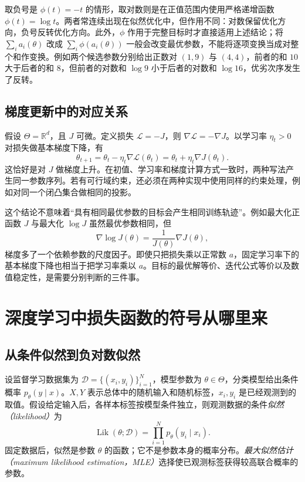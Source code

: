 \documentclass[UTF8,12pt,a4paper,fontset=fandol]{ctexart}
\begin{document}
取负号是 $\phi(t)=-t$ 的情形，取对数则是在正值范围内使用严格递增函数 $\phi(t)=\log t$。两者常连续出现在似然优化中，但作用不同：对数保留优化方向，负号反转优化方向。此外，$\phi$ 作用于完整目标时才直接适用上述结论；将 $\sum_i a_i(\theta)$ 改成 $\sum_i\phi(a_i(\theta))$ 一般会改变最优参数，不能将逐项变换当成对整个和作变换。例如两个候选参数分别给出正数对 $(1,9)$ 与 $(4,4)$，前者的和 $10$ 大于后者的和 $8$，但前者的对数和 $\log9$ 小于后者的对数和 $\log16$，优劣次序发生了反转。

\subsection{梯度更新中的对应关系}

假设 $\Theta=\mathbb R^d$，且 $J$ 可微。定义损失 $\mathcal L=-J$，则 $\nabla\mathcal L=-\nabla J$。以学习率 $\eta_t>0$ 对损失做基本梯度下降，有
\begin{equation}
 \theta_{t+1}
 =\theta_t-\eta_t\nabla\mathcal L(\theta_t)
 =\theta_t+\eta_t\nabla J(\theta_t).
 \label{eq:duality-gradient-sign}
\end{equation}
这恰好是对 $J$ 做梯度上升。在初值、学习率和梯度计算方式一致时，两种写法产生同一参数序列。若有可行域约束，还必须在两种实现中使用同样的约束处理，例如对同一个闭凸集合做相同的投影。

这个结论不意味着“具有相同最优参数的目标会产生相同训练轨迹”。例如最大化正函数 $J$ 与最大化 $\log J$ 虽然最优参数相同，但
\[
 \nabla\log J(\theta)=\frac{1}{J(\theta)}\nabla J(\theta),
\]
梯度多了一个依赖参数的尺度因子。即使只把损失乘以正常数 $a$，固定学习率下的基本梯度下降也相当于把学习率乘以 $a$。目标的最优解等价、迭代公式等价以及数值稳定性，是需要分别判断的三件事。

\section{深度学习中损失函数的符号从哪里来}
\label{sec:duality-learning}

\subsection{从条件似然到负对数似然}

设监督学习数据集为 $\mathcal D=\{(x_i,y_i)\}_{i=1}^N$，模型参数为 $\theta\in\Theta$，分类模型给出条件概率 $p_\theta(y\mid x)$。$X,Y$ 表示总体中的随机输入和随机标签，$x_i,y_i$ 是已经观测到的取值。假设给定输入后，各样本标签按模型条件独立，则观测数据的条件\emph{似然（likelihood）}为
\begin{equation}
 \operatorname{Lik}(\theta;\mathcal D)
 =\prod_{i=1}^N p_\theta(y_i\mid x_i).
 \label{eq:duality-likelihood}
\end{equation}
固定数据后，似然是参数 $\theta$ 的函数；它不是参数本身的概率分布。\emph{最大似然估计（maximum likelihood estimation，MLE）}选择使已观测标签获得较高联合概率的参数。
\end{document}
